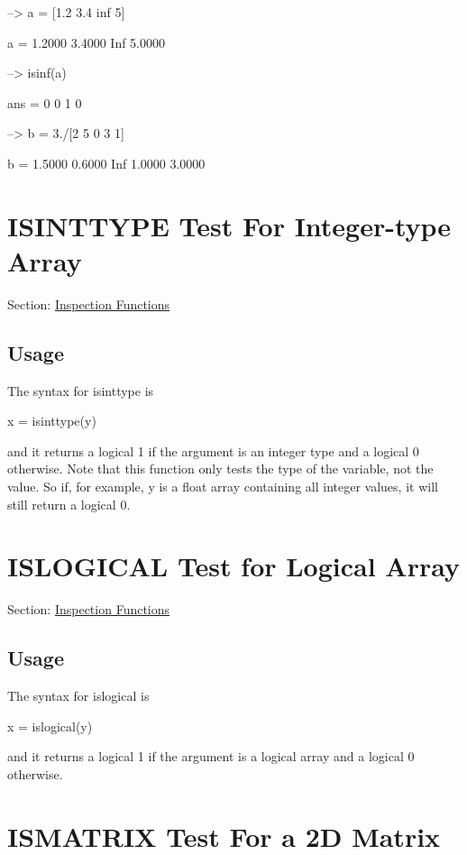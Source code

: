 \begin{DoxyVerbInclude}
--> a = [1.2 3.4 inf 5]

a = 
    1.2000    3.4000 Inf    5.0000 

--> isinf(a)

ans = 
 0 0 1 0 

--> b = 3./[2 5 0 3 1]

b = 
    1.5000    0.6000 Inf    1.0000    3.0000 
\end{DoxyVerbInclude}
 \hypertarget{inspection_isinttype}{}\section{I\-S\-I\-N\-T\-T\-Y\-P\-E Test For Integer-\/type Array}\label{inspection_isinttype}
Section\-: \hyperlink{sec_inspection}{Inspection Functions} \hypertarget{vtkwidgets_vtkxyplotwidget_Usage}{}\subsection{Usage}\label{vtkwidgets_vtkxyplotwidget_Usage}
The syntax for {\ttfamily isinttype} is \begin{DoxyVerb}   x = isinttype(y)
\end{DoxyVerb}
 and it returns a logical 1 if the argument is an integer type and a logical 0 otherwise. Note that this function only tests the type of the variable, not the value. So if, for example, {\ttfamily y} is a {\ttfamily float} array containing all integer values, it will still return a logical 0. \hypertarget{inspection_islogical}{}\section{I\-S\-L\-O\-G\-I\-C\-A\-L Test for Logical Array}\label{inspection_islogical}
Section\-: \hyperlink{sec_inspection}{Inspection Functions} \hypertarget{vtkwidgets_vtkxyplotwidget_Usage}{}\subsection{Usage}\label{vtkwidgets_vtkxyplotwidget_Usage}
The syntax for {\ttfamily islogical} is \begin{DoxyVerb}   x = islogical(y)
\end{DoxyVerb}
 and it returns a logical 1 if the argument is a logical array and a logical 0 otherwise. \hypertarget{inspection_ismatrix}{}\section{I\-S\-M\-A\-T\-R\-I\-X Test For a 2\-D Matrix}\label{inspection_ismatrix}
